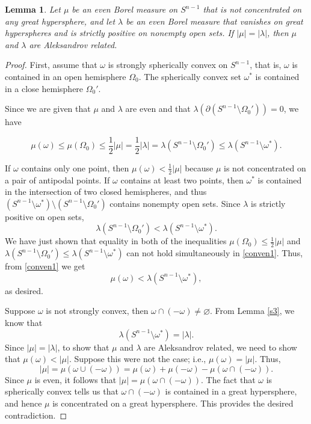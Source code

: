\documentclass{cpamart1}     %
\newtheorem{lemm}[theo]{Lemma}
\theoremstyle{definition}
\theoremstyle{remark}
\newcommand{\sn}{S^{n-1}}
\begin{document}
\begin{lemm}\label{s5}
Let $\mu$ be an even Borel measure on $\sn$ that is not concentrated
on any great hypersphere, and let $\lambda$ be an even Borel measure
that vanishes on great hyperspheres and is strictly positive on nonempty open sets. If
$|\mu|=|\lambda|$, then $\mu$ and $\lambda$ are Aleksandrov related.
\end{lemm}

\begin{proof}
First, assume that $\omega$ is strongly spherically convex on $\sn$, that is, $\omega$ is
contained in an open hemisphere $\Omega_0$. The spherically convex set $\omega^*$ is
contained in a close hemisphere $\Omega_0'$.

Since we are given that $\mu$ and $\lambda$ are even and that
$\lambda( \partial(\sn\setminus \Omega_0'))=0$,
we have

\begin{equation}\label{conven1}
\mu(\omega) \le \mu(\Omega_0)
\le \frac12 |\mu| =\frac12 |\lambda| =\lambda(\sn\setminus\Omega_0')
\le\lambda(\sn \setminus \omega^*).
\end{equation}


If $\omega$ contains only one point, then $\mu(\omega) < \frac12 |\mu|$ because $\mu$
is not concentrated on a pair of antipodal points.
If $\omega$ contains at least two points, then
$\omega^*$ is contained in the intersection of two closed hemispheres, and thus
$(\sn \setminus \omega^*)\setminus (\sn\setminus\Omega_0')$
contains nonempty open sets. Since $\lambda$ is strictly positive on open sets,
\[
\lambda(\sn\setminus\Omega_0') < \lambda (\sn \setminus \omega^*).
\]
We have just shown that equality in both of the inequalities $\mu(\Omega_0) \le \frac12|\mu| $ and
$\lambda(\sn\setminus\Omega_0') \le \lambda (\sn \setminus \omega^*)$
can not hold simultaneously in \eqref{conven1}. Thus, from \eqref{conven1} we get
\[
\mu(\omega) < \lambda (\sn \setminus \omega^*),
\]
as desired.


Suppose $\omega$ is not strongly convex, then $\omega\cap (-\omega)\neq \varnothing$.
From Lemma \ref{s3}, we know that
\[
\lambda(\sn \setminus \omega^*) = |\lambda|.
\]
Since $|\mu|=|\lambda|$, to show that $\mu$ and $\lambda$ are Aleksandrov related,
 we need to show that $\mu(\omega) < |\mu|$.
Suppose this were not the case; i.e., $\mu(\omega) = |\mu|$. Thus,
\[
|\mu|=\mu(\omega\cup (-\omega)) = \mu(\omega)+\mu(-\omega) - \mu(\omega\cap (-\omega)).
\]
Since $\mu$ is even, it follows that $|\mu|=\mu(\omega\cap (-\omega))$. The fact
that $\omega$ is spherically convex tells us that $\omega\cap (-\omega)$
is contained in a great hypersphere, and hence $\mu$ is
concentrated on a great hypersphere. This provides the desired contradiction.
\end{proof}
\end{document}
